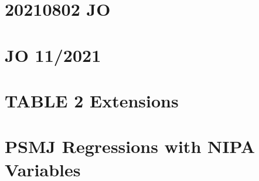 \documentclass{report}
\numberwithin{equation}{section}
\numberwithin{figure}{section}
\numberwithin{table}{section}
\begin{document}
\section{20210802 JO} 



 \section{JO 11/2021} 

\section{TABLE 2 Extensions} 

\section{PSMJ Regressions with NIPA Variables} 

  



\end{document}
